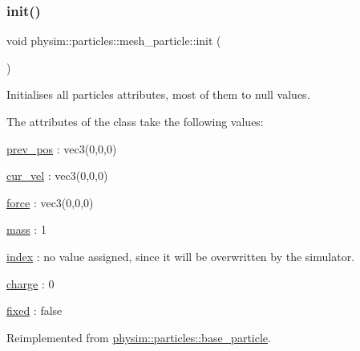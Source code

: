 \subsubsection{\texorpdfstring{init()}{init()}}
{\footnotesize\ttfamily void physim\+::particles\+::mesh\+\_\+particle\+::init (\begin{DoxyParamCaption}{ }\end{DoxyParamCaption})\hspace{0.3cm}{\ttfamily [virtual]}}



Initialises all particle\textquotesingle{}s attributes, most of them to null values. 

The attributes of the class take the following values\+:
\begin{DoxyItemize}
\item \hyperlink{classphysim_1_1particles_1_1base__particle_a08072db6a1a59d21acc9cac6ac8965f7}{prev\+\_\+pos} \+: vec3(0,0,0)
\item \hyperlink{classphysim_1_1particles_1_1base__particle_a66a164d2a130c40901e3ec2709cdad43}{cur\+\_\+vel} \+: vec3(0,0,0)
\item \hyperlink{classphysim_1_1particles_1_1base__particle_adc3b11899d2e50970ae5d4931721a0ef}{force} \+: vec3(0,0,0)
\item \hyperlink{classphysim_1_1particles_1_1base__particle_acb5c9f0b4a911d8981210e2cfc4dda8a}{mass} \+: 1
\item \hyperlink{classphysim_1_1particles_1_1base__particle_a44f5de3bb4b860dfd511e28e1d6519d5}{index} \+: no value assigned, since it will be overwritten by the simulator.
\item \hyperlink{classphysim_1_1particles_1_1mesh__particle_adf14d64e9effa2bcf5cb84a537bd8027}{charge} \+: 0
\item \hyperlink{classphysim_1_1particles_1_1mesh__particle_a5813a57507d8a3539a1534dfd1b74883}{fixed} \+: false 
\end{DoxyItemize}

Reimplemented from \hyperlink{classphysim_1_1particles_1_1base__particle_a3bba517d51fd0bff7ec583e701765f87}{physim\+::particles\+::base\+\_\+particle}.

\mbox{\label{classphysim_1_1particles_1_1mesh__particle_acf394e0f807a6105e579750afbadeaea}} 
